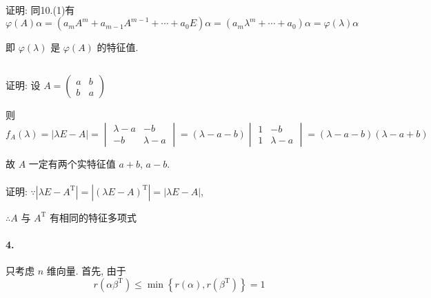 	 \paragraph{} %
		 证明: 同10.(1)有 \( \varphi(A)\alpha = (a_{m}A^{m} + a_{m-1}A^{m-1} + \cdots + a_{0}E)\alpha = (a_{m}\lambda^{m} + \cdots + a_{0})\alpha = \varphi(\lambda)\alpha \)

		 即 \(\varphi(\lambda)\) 是 \(\varphi(A)\) 的特征值.


 \subsection{} %


	 \paragraph{} %
		 证明: 设 \( A = \begin{pmatrix}
			 a & b \\
			 b & a
		 \end{pmatrix} \)

		 则 \( f_{A}(\lambda) = |\lambda E - A| = \begin{vmatrix}
			 \lambda - a & -b          \\
			 -b          & \lambda - a
		 \end{vmatrix} = (\lambda - a - b)\begin{vmatrix}
			 1 & -b          \\
			 1 & \lambda - a
		 \end{vmatrix} = (\lambda - a - b)(\lambda - a + b) \)

		 故 \( A \) 一定有两个实特征值 \( a+b \), \( a-b \).


	 \paragraph{} %
		 证明: \( \because |\lambda E - A^{\mathrm{T}}| = |(\lambda E - A)^{\mathrm{T}}| = |\lambda E - A| \),

		 \( \therefore A \) 与 \( A^{\mathrm{T}} \) 有相同的特征多项式

	 \paragraph{4.} %


		 只考虑 \( n \) 维向量. 首先, 由于
		 \[ r(\alpha\beta^{\mathrm{T}}) \leq \min\left\{ r(\alpha), r(\beta^{\mathrm{T}}) \right\} = 1 \]

